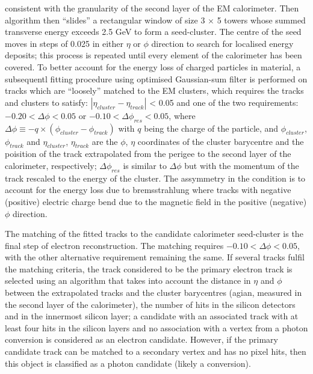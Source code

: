consistent with the granularity of the second layer of the EM calorimeter. 
Then algorithm then ``slides'' a rectangular window of size 3 $\times$ 5 towers 
whose summed transverse energy exceeds 2.5 GeV to form a seed-cluster.
The centre of the seed moves in steps of 0.025 in either $\eta$ or $\phi$ direction 
to search for localised energy deposits; 
this process is repeated until every element of the calorimeter has been covered.
To better account for the energy loss of charged particles in material,
a subsequentl fitting procedure using optimised Gaussian-sum filter \cite{ATLAS-CONF-2012-047} 
is performed on tracks which are ``loosely'' matched to the EM clusters, 
which requires the tracks and clusters to satisfy:
$|\eta_{cluster} - \eta_{track}|$ < 0.05
and one of the two requirements:
$-0.20 < \Delta \phi < 0.05$ 
or
$-0.10 < \Delta \phi_{res} < 0.05$,
where $\Delta\phi \equiv -q \times (\phi_{cluster} - \phi_{track})$ with 
$q$ being the charge of the particle, and 
$\phi_{cluster}$, $\phi_{track}$ and $\eta_{cluster}$, $\eta_{track}$ 
are the $\phi$, $\eta$ coordinates of
the cluster barycentre and the poisition of the track extrapolated from the 
perigee to the second layer of the calorimeter, respectively;
$\Delta \phi_{res}$ is similar to $\Delta \phi$ but with the 
momentum of the track rescaled to the energy of the cluster.
The assymmetry in the condition is to account for the energy loss
due to bremsstrahlung where tracks with negative (positive) electric charge
bend due to the magnetic field in the positive (negative) $\phi$ direction.

The matching of the fitted tracks to the candidate calorimeter seed-cluster
is the final step of electron reconstruction. 
The matching requires $-0.10 < \Delta\phi < 0.05$,
with the other alternative requirement remaining the same.
If several tracks fulfil the matching criteria, 
the track considered to be the primary electron track is selected 
using an algorithm that takes into account the distance in $\eta$
and $\phi$ between the extrapolated tracks and the cluster barycentres 
(agian, measured in the second layer of the calorimeter), 
the number of hits in the silicon detectors and in the innermost silicon layer; 
a candidate with an associated track with at least four hits in the silicon layers and no association
with a vertex from a photon conversion is considered as an electron candidate. 
However, if the primary candidate track can be matched to a secondary vertex and has no pixel hits, 
then this object is classified as a photon candidate (likely a conversion). 

